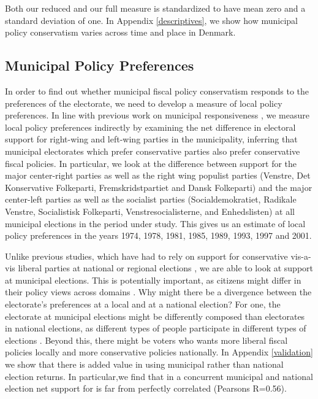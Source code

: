 \documentclass[a4paper,12pt]{article}
\begin{document}
Both our reduced and our full measure is standardized to have mean zero and a standard deviation of one. In Appendix \ref{descriptives}, we show how municipal policy conservatism varies across time and place in Denmark.



\subsection*{Municipal Policy Preferences}

In order to find out whether municipal fiscal policy conservatism responds to the preferences of the electorate, we need to develop a measure of local policy preferences. In line with previous work on municipal responsiveness \cite[e.g.,][]{sances2017ideology,einstein2016pushing}, we measure local policy preferences indirectly by examining the net difference in electoral support for right-wing and left-wing parties in the municipality, inferring that municipal electorates which prefer conservative parties also prefer conservative fiscal policies. In particular, we look at the difference between support for the major center-right parties as well as the right wing populist parties (Venstre, Det Konservative Folkeparti, Fremskridstpartiet and Dansk Folkeparti) and the major center-left parties as well as the socialist parties (Socialdemokratiet, Radikale Venstre, Socialistisk Folkeparti, Venstresocialisterne, and Enhedslisten) at all municipal elections in the period under study. This gives us an estimate of local policy preferences in the years 1974, 1978, 1981, 1985, 1989, 1993, 1997 and 2001.

 Unlike previous studies, which have had to rely on support for conservative vis-a-vis liberal parties at national or regional elections \citep[e.g.,]{hajnal2010or,einstein2016pushing}, we are able to look at support at municipal elections. This is potentially important, as citizens might differ in their policy views across domains \cite[for an argument along these lines, see]{abrams2012big}.  Why might there be a divergence between the electorate's preferences at a local and at a national election?  For one, the electorate at municipal elections might be differently composed than electorates in national elections, as different types of people participate in different types of elections \citep{ansolabehere2015beyond,hansen2017social}. Beyond this, there might be voters who wants more liberal fiscal policies locally and more conservative policies nationally. In Appendix  \ref{validation} we show that there is added value in using municipal rather than national election returns. In particular,we find that in a concurrent municipal and national election net support for is far from perfectly correlated (Pearsons R=0.56).
 
\end{document}
